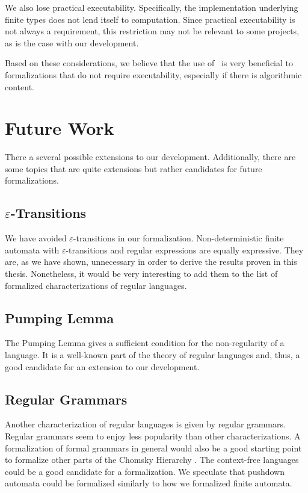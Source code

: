 We also lose practical executability. 
Specifically, the implementation underlying finite types does not lend itself to computation. 
Since practical executability is not always a requirement, this restriction may not be relevant to some projects, as is the case with our development.

Based on these considerations, we believe that the use of \ssreflect\ is very beneficial to formalizations that do not require executability, especially if there is algorithmic content. 



\section{Future Work}
There a several possible extensions to our development.
Additionally, there are some topics that are quite extensions but rather candidates for future formalizations.


\subsection[$\varepsilon$-Transitions]{\texorpdfstring{$\varepsilon$-Transitions}{Epsilon-Transitions}}
We have avoided $\varepsilon$-transitions in our formalization. 
Non-deterministic finite automata with $\varepsilon$-transitions and regular expressions are equally expressive.
They are, as we have shown, unnecessary in order to derive the results proven in this thesis.
Nonetheless, it would be very interesting to add them to the list of formalized characterizations of regular languages.

\subsection{Pumping Lemma}
The Pumping Lemma \cite{BarHillelPerlesShamir61Formal} gives a sufficient condition for the non-regularity of a language. 
It is a well-known part of the theory of regular languages and, thus, a good candidate for an extension to our development.

\subsection{Regular Grammars}
Another characterization of regular languages is given by regular grammars.
Regular grammars seem to enjoy less popularity than other characterizations.
A formalization of formal grammars in general would also be a good starting point to formalize other parts of the
Chomsky Hierarchy \cite{Chomsky1956}. 
The context-free languages could be a good candidate for a formalization.
We speculate that pushdown automata could be formalized similarly to how we formalized finite automata.

